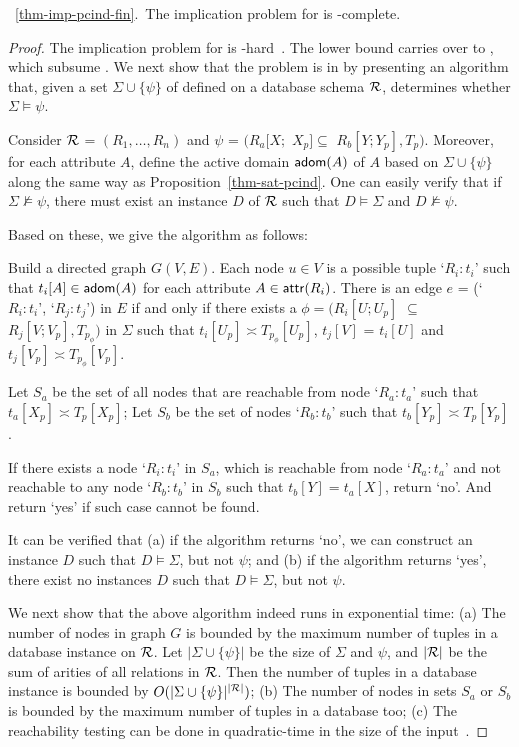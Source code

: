 \vspace{2ex} \noindent{}~\ref{thm-imp-pcind-fin}.~The
implication problem for \pCINDs is \EXPTIME-complete. \eop

\begin{proof} The implication problem for \CINDs is
\EXPTIME-hard~\cite{CINDs}. The lower bound carries over to \pCINDs,
which subsume \CINDs. We next show that the problem is in \EXPTIME
by presenting an \EXPTIME algorithm that, given a set
$\Sigma\cup\{\psi\}$ of \pCINDs defined on a database schema $\cal
R$, determines whether $\Sigma\models\psi$.

Consider $\cal R$ = $(R_1,\ldots,R_n)$ and $\psi$ = $(R_a[X;$ $X_p]
\subseteq$ $R_b[Y;Y_p], T_p)$. Moreover, for each attribute $A$,
define the active domain ${\mathsf{adom}}(A)$ of $A$ based on
$\Sigma\cup\{\psi\}$ along the same way as
Proposition~\ref{thm-sat-pcind}. One can easily verify that if
$\Sigma\not\models\psi$, there must exist an instance $D$ of ${\cal
R}$ such that $D\models\Sigma$ and $D\not\models\psi$.

Based on these, we give the \EXPTIME algorithm as follows:

\bi
\item
Build a directed graph $G(V, E)$.  Each node $u\in V$ is a possible
tuple `$R_i:t_i$' such that $t_i[A]\in {\ensuremath {\mathsf{adom}}}(A)$ for each attribute
$A\in\protect\mathsf{attr}(R_i)$. There is an edge $e$ = (`$R_i:t_i$',
`$R_j:t_j$') in $E$ if and only if there exists a \pCIND $\phi =
(R_i[U; U_p]$ $\subseteq$ $ R_j[V; V_p], T_{p_{\phi}})$ in $\Sigma$
such that $t_i[U_p] \asymp T_{p_{\phi}}[U_p]$, $t_j[V]$ = $t_i[U]$
and $t_j[V_p] \asymp T_{p_{\phi}}[V_p]$.
\item
Let $S_a$ be the set of all nodes that are reachable from node
`$R_a:t_a$' such that $t_a[X_p] \asymp T_{p}[X_p]$;
 Let $S_b$ be the
set of nodes `$R_b:t_b$' such that $t_b[Y_p] \asymp T_{p}[Y_p]$.
\item
If there exists a node `$R_i:t_i$' in $S_a$, which is reachable from
node `$R_a:t_a$' and not reachable to any node `$R_b:t_b$' in $S_b$
such that $t_b[Y] = t_a[X]$, return `no'. And return `yes' if such
case cannot be found. \ei


It can be verified that (a) if the algorithm returns `no', we can
construct an instance $D$ such that $D\models\Sigma$, but not
$\psi$; and (b) if the algorithm returns `yes', there exist no
instances $D$ such that $D\models\Sigma$, but not $\psi$.

We next show that the above algorithm indeed runs in exponential
time: (a) The number of nodes in graph $G$ is bounded by the maximum
number of tuples in a database instance on $\R$. Let
$|\Sigma\cup\{\psi\}|$ be the size of $\Sigma$ and $\psi$, and
$|\cal R|$ be the sum of arities of all relations in $\cal R$. Then
the number of tuples in a database instance is bounded by
$O(|\Sigma\cup\{\psi\}|^{|\cal
 R|})$; (b) The number of nodes in sets $S_a$ or $S_b$ is bounded by
the maximum number of tuples in a database too; (c) The reachability
testing can be done in quadratic-time in the size of the
input~\cite{Papa1994}.


\end{proof}
